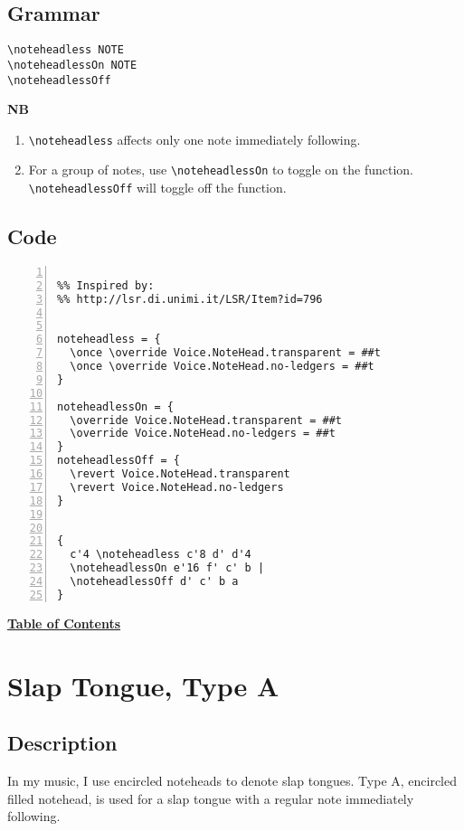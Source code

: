 \subsection{Grammar}
\begin{verbatim}
\noteheadless NOTE
\noteheadlessOn NOTE 
\noteheadlessOff
\end{verbatim}

\textbf{NB} 
\begin{enumerate} 
\item \verb|\noteheadless| affects only one note immediately following. 
\item For a group of notes, use \verb|\noteheadlessOn| to toggle on the function.  \verb|\noteheadlessOff| will toggle off the function.
\end{enumerate}

\subsection{Code}
\begin{Verbatim}[numbers=left,xleftmargin=5mm]

%% Inspired by:
%% http://lsr.di.unimi.it/LSR/Item?id=796


noteheadless = {
  \once \override Voice.NoteHead.transparent = ##t
  \once \override Voice.NoteHead.no-ledgers = ##t
}

noteheadlessOn = {
  \override Voice.NoteHead.transparent = ##t
  \override Voice.NoteHead.no-ledgers = ##t
}
noteheadlessOff = {
  \revert Voice.NoteHead.transparent
  \revert Voice.NoteHead.no-ledgers
}


{
  c'4 \noteheadless c'8 d' d'4
  \noteheadlessOn e'16 f' c' b |
  \noteheadlessOff d' c' b a
}

\end{Verbatim}
\hyperref[sec:toc]{\textbf{Table of Contents}}

\vfill \break


\section {Slap Tongue, Type A}
\hfill

\subsection{Description}
	In my music, I use encircled noteheads to denote slap tongues. Type A, encircled filled notehead, is used for a slap tongue with a regular note immediately following. 
	
